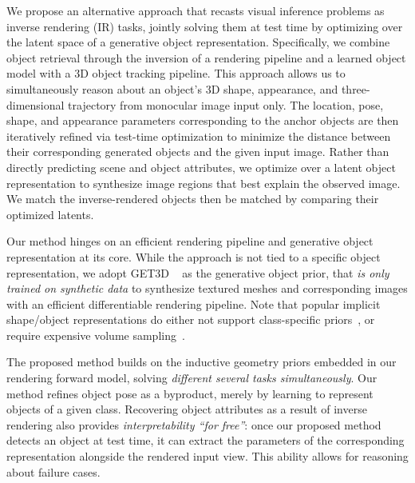 We propose an alternative approach that recasts visual inference problems as inverse rendering (IR) tasks, jointly solving them at test time by optimizing over the latent space of a generative object representation. Specifically, we combine object retrieval through the inversion of a rendering pipeline and a learned object model with a 3D object tracking pipeline. This approach allows us to simultaneously reason about an object's 3D shape, appearance, and three-dimensional trajectory from monocular image input only. The location, pose, shape, and appearance parameters corresponding to the anchor objects are then iteratively refined via test-time optimization to minimize the distance between their corresponding generated objects and the given input image. Rather than directly predicting scene and object attributes, we optimize over a latent object representation to synthesize image regions that best explain the observed image. We match the inverse-rendered objects then be matched by comparing their optimized latents. 

Our method hinges on an efficient rendering pipeline and generative object representation at its core. While the approach is not tied to a specific object representation, we adopt GET3D ~\cite{gao2022get3d} as the generative object prior, that \emph{is only trained on synthetic data} to synthesize textured meshes and corresponding images with an efficient differentiable rendering pipeline. Note that popular implicit shape/object representations do either not support class-specific priors~\cite{park2019deepsdf, mildenhall2020nerf}, or require expensive volume sampling~\cite{shen2023gina3d}. 

The proposed method builds on the inductive geometry priors embedded in our rendering forward model, solving \emph{different several tasks simultaneously}. %
Our method refines object pose as a byproduct, merely by learning to represent objects of a given class. Recovering object attributes as a result of inverse rendering also provides \emph{interpretability ``for free''}: once our proposed method detects an object at test time, it can extract the parameters of the corresponding representation alongside the rendered input view. This ability allows for reasoning about failure cases.

